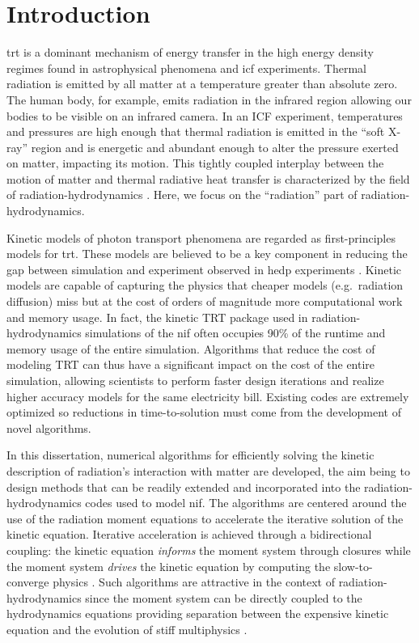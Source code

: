 \documentclass[../doc.tex]{subfiles}
\begin{document}
\chapter{Introduction}
\Gls{trt} is a dominant mechanism of energy transfer in the high energy density regimes found in astrophysical phenomena and \gls{icf} experiments. 
Thermal radiation is emitted by all matter at a temperature greater than absolute zero. The human body, for example, emits radiation in the infrared region allowing our bodies to be visible on an infrared camera. In an ICF experiment, temperatures and pressures are high enough that thermal radiation is emitted in the ``soft X-ray'' region and is energetic and abundant enough to alter the pressure exerted on matter, impacting its motion.
This tightly coupled interplay between the motion of matter and thermal radiative heat transfer is characterized by the field of radiation-hydrodynamics \cite{castor2004radiation,mihalas1999foundations}. Here, we focus on the ``radiation'' part of radiation-hydrodynamics. 

Kinetic models of photon transport phenomena are regarded as first-principles models for \gls{trt}. These models are believed to be a key component in reducing the gap between simulation and experiment observed in \gls{hedp} experiments \cite{osti_1460933}.
Kinetic models are capable of capturing the physics that cheaper models (e.g.~radiation diffusion) miss but at the cost of orders of magnitude more computational work and memory usage. 
In fact, the kinetic TRT package used in radiation-hydrodynamics simulations of the \gls{nif} often occupies 90\% of the runtime and memory usage of the entire simulation. Algorithms that reduce the cost of modeling TRT can thus have a significant impact on the cost of the entire simulation, allowing scientists to perform faster design iterations and realize higher accuracy models for the same electricity bill. 
Existing codes are extremely optimized so reductions in time-to-solution must come from the development of novel algorithms. 

In this dissertation, numerical algorithms for efficiently solving the kinetic description of radiation's interaction with matter are developed, the aim being to design methods that can be readily extended and incorporated into the radiation-hydrodynamics codes used to model \gls{nif}. The algorithms are centered around the use of the radiation moment equations to accelerate the iterative solution of the kinetic equation. 
Iterative acceleration is achieved through a bidirectional coupling: the kinetic equation \emph{informs} the moment system through closures while the moment system \emph{drives} the kinetic equation by computing the slow-to-converge physics \cite{CHACON201721}. Such algorithms are attractive in the context of radiation-hydrodynamics since the moment system can be directly coupled to the hydrodynamics equations providing separation between the expensive kinetic equation and the evolution of stiff multiphysics \cite{doi:10.13182/NSE16-45}. 
\end{document}
